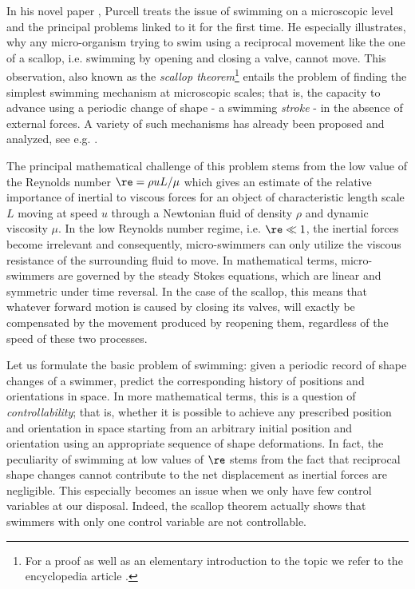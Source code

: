 
In his novel paper \cite{Purcell1977}, Purcell treats the issue of swimming on a microscopic level and the principal problems linked to it for the first time. He especially illustrates, why any micro-organism trying to swim using a reciprocal movement like the one of a scallop, i.e. swimming by opening and closing a valve, cannot move. This observation, also known as the \emph{scallop theorem}\footnote{For a proof as well as an elementary introduction to the topic we refer to the encyclopedia article \cite{DeSimone2011}.} entails the problem of finding the simplest swimming mechanism at microscopic scales; that is, the capacity to advance using a periodic change of  shape - a swimming \emph{stroke} - in  the absence of external forces. A variety of such mechanisms has already been proposed and analyzed, see e.g. \cite{Alouges2013, Najafi2004, Purcell1977}.


The principal mathematical challenge of this problem stems from the low value of the Reynolds number $\re = \rho u L/\mu$ which gives an estimate of the relative importance of inertial to viscous forces for an object of characteristic length scale $L$ moving at speed $u$ through a Newtonian fluid of density $\rho$ and dynamic viscosity $\mu$. In the low Reynolds number regime, i.e. $\re \ll 1$, the inertial forces become irrelevant and consequently, micro-swimmers can only utilize the viscous resistance of the surrounding fluid to move. In mathematical terms, micro-swimmers are governed by the steady Stokes equations, which are linear and symmetric under time reversal. In the case of the scallop, this means that whatever forward motion is caused by closing its valves, will exactly be compensated by the movement produced by reopening them, regardless of the speed of these two processes.

Let us formulate the basic problem of swimming: given a periodic record of shape changes of a swimmer, predict the corresponding history of positions and orientations in space. In more mathematical terms, this is a question of \emph{controllability}; that is, whether it is possible to achieve any prescribed position and orientation in space starting from an arbitrary initial position and orientation using an appropriate sequence of shape deformations. In fact, the peculiarity of swimming at low values of $\re$ stems from the fact that reciprocal shape changes cannot contribute to the net displacement as inertial forces are negligible. This especially becomes an issue when we only have few control variables at our disposal. Indeed, the scallop theorem actually shows that swimmers with only one control variable are not controllable.

